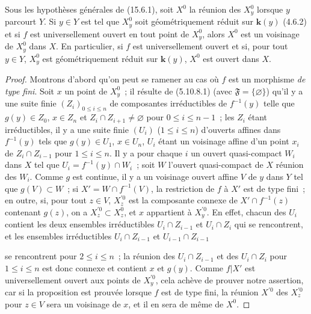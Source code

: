 \begin{proposition}[15.6.4]
\label{IV.15.6.4-fr}
Sous les hypothèses générales de (15.6.1), soit $X^0$ la réunion des $X_y^0$ lorsque $y$ parcourt $Y$. Si $y\in Y$ est tel que $X_y^0$ soit géométriquement réduit sur $\mathbf{k}(y)$ (4.6.2) et si $f$ est universellement ouvert en tout point de $X_y^0$, alors $X^0$ est un voisinage de $X_y^0$ dans $X$. En particulier, si $f$ est universellement ouvert et si, pour tout $y\in Y$, $X_y^0$ est géométriquement réduit sur $\mathbf{k}(y)$, $X^0$ est ouvert dans $X$.
\end{proposition}

\begin{proof}
Montrons d'abord qu'on peut se ramener au cas où $f$ est un morphisme \emph{de type fini}. Soit $x$ un point de $X_y^0$~; il résulte de (5.10.8.1) (avec $\mathfrak F=\{\varnothing\}$) qu'il y a une suite finie $(Z_i)_{0\leqslant i\leqslant n}$ de composantes irréductibles de $f^{-1}(y)$ telle que $g(y)\in Z_0$, $x\in Z_n$ et $Z_i\cap Z_{i+1}\ne\varnothing$ pour $0\leqslant i\leqslant n-1$~; les $Z_i$ étant irréductibles, il y a une suite finie $(U_i)$ ($1\leqslant i\leqslant n$) d'ouverts affines dans $f^{-1}(y)$ tels que $g(y)\in U_1$, $x\in U_n$, $U_i$ étant un voisinage affine d'un point $x_i$ de $Z_i\cap Z_{i-1}$ pour $1\leqslant i\leqslant n$. Il y a pour chaque $i$ un ouvert quasi-compact $W_i$ dans $X$ tel que $U_i=f^{-1}(y)\cap W_i$~; soit $W$ l'ouvert quasi-compact de $X$ réunion des $W_i$. Comme $g$ est continue, il y a un voisinage ouvert affine $V$ de $y$ dans $Y$ tel que $g(V)\subset W$~; si $X'=W\cap f^{-1}(V)$, la restriction de $f$ à $X'$ est de type fini~; en outre, si, pour tout $z\in V$, $X_z^{\prime 0}$ est la composante connexe de $X'\cap f^{-1}(z)$ contenant $g(z)$, on a $X_z^{\prime 0}\subset X_z^0$, et $x$ appartient à $X_y^{\prime 0}$. En effet, chacun des $U_i$ contient les deux ensembles irréductibles $U_i\cap Z_{i-1}$ et $U_i\cap Z_i$ qui se rencontrent, et les ensembles irréductibles $U_i\cap Z_{i-1}$ et $U_{i-1}\cap Z_{i-1}$

se rencontrent pour $2\leqslant i\leqslant n$~; la réunion des $U_i\cap Z_{i-1}$ et des $U_i\cap Z_i$ pour $1\leqslant i\leqslant n$ est donc connexe et contient $x$ et $g(y)$. Comme $f|X'$ est universellement ouvert aux points de $X_y^{\prime 0}$, cela achève de prouver notre assertion, car si la proposition est prouvée lorsque $f$ est de type fini, la réunion $X^{\prime 0}$ des $X_z^{\prime 0}$ pour $z\in V$ sera un voisinage de $x$, et il en sera de même de $X^0$.


\end{proof}
